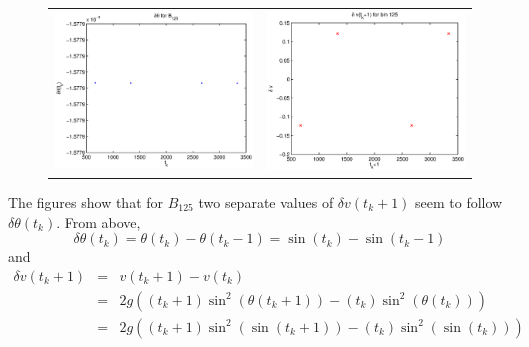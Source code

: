 \documentclass[a4paper,11pt]{article}
\begin{document}
\begin{figure}[ht]
\begin{tabular}{ll}
\includegraphics[scale=0.65]{dthetabin125.eps} & \includegraphics[scale=0.65]{dvbin125.eps}\\
\end{tabular}
\caption{}
\label{fig:dthetadv}
\end{figure}
The figures show that for $B_{125}$ two separate values of $\delta v(t_k+1)$ seem to follow $\delta\theta(t_k)$.  From above,
$$
\delta\theta(t_k) = \theta(t_k)-\theta(t_k-1) = \sin(t_k) - \sin(t_k-1)
$$
and
\begin{eqnarray*}
\delta v(t_k+1) &=& v(t_k+1)-v(t_k)\\
&=& 2g\left(\left(t_k+1\right)\sin^2 \left(\theta(t_k+1)\right) - \left(t_k\right)\sin^2 \left(\theta(t_k)\right) \right)\\
&=& 2g\left(\left(t_k+1\right)\sin^2 \left(\sin(t_k+1)\right) - \left(t_k\right)\sin^2 \left(\sin(t_k)\right) \right)
\end{eqnarray*}
\end{document}
